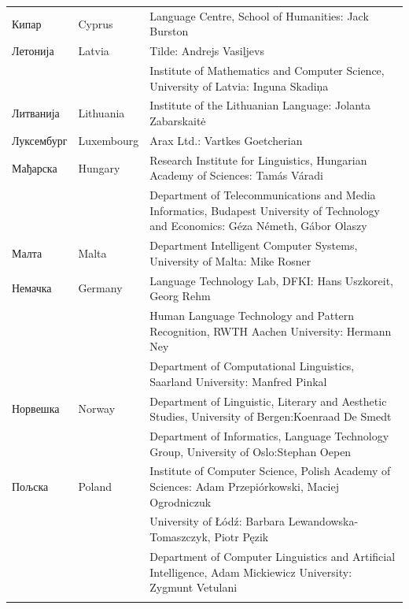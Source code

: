 \begin{longtable}{llp{114mm}}
  Кипар & \textcolor{grey1}{Cyprus} & Language Centre, School of Humanities: Jack Burston \\ \addlinespace
  Летонија & \textcolor{grey1}{Latvia} & Tilde: Andrejs Vasiļjevs\\ \addlinespace 
  & & Institute of Mathematics and Computer Science, University of Latvia: Inguna Skadiņa\\ \addlinespace
  Литванија &  \textcolor{grey1}{Lithuania} & Institute of the Lithuanian Language: Jolanta Zabarskaitė\\ \addlinespace
  Луксембург & \textcolor{grey1}{Luxembourg} & Arax Ltd.: Vartkes Goetcherian\\ \addlinespace
  Мађарска & \textcolor{grey1}{Hungary} & Research Institute for Linguistics, Hungarian Academy of Sciences: Tamás Váradi\\  \addlinespace
  & & Department of Telecommunications and Media Informatics, Budapest University of Technology and Economics: Géza Németh, Gábor Olaszy\\ \addlinespace
  Малта & \textcolor{grey1}{Malta} & Department Intelligent Computer Systems, University of Malta: Mike Rosner\\ \addlinespace
  Немачка & \textcolor{grey1}{Germany} & Language Technology Lab, DFKI: Hans Uszkoreit, Georg Rehm\\ \addlinespace
  & & Human Language Technology and Pattern Recognition, RWTH Aachen University: Hermann Ney \\ \addlinespace
  & & Department of Computational Linguistics, Saarland University: Manfred Pinkal\\ \addlinespace 
  Норвешка &  \textcolor{grey1}{Norway} & Department of Linguistic, Literary and Aesthetic Studies, University of Bergen:\newline Koenraad De Smedt\\ \addlinespace 
  & & Department of Informatics, Language Technology Group, University of Oslo:\newline Stephan Oepen \\ \addlinespace
  Пољска &  \textcolor{grey1}{Poland} & Institute of Computer Science, Polish Academy of Sciences: Adam Przepiórkowski, Maciej Ogrodniczuk \\ \addlinespace
  & & University of Łódź: Barbara Lewandowska-Tomaszczyk, Piotr Pęzik\\ \addlinespace
  & & Department of Computer Linguistics and Artificial Intelligence, Adam Mickiewicz University: Zygmunt Vetulani \\ \addlinespace

\end{longtable}
